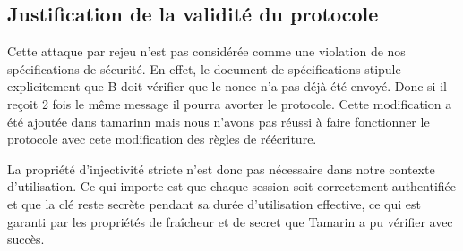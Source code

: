\subsection{Justification de la validité du protocole}

Cette attaque par rejeu n'est pas considérée comme une violation de nos spécifications de
sécurité. En effet, le document de spécifications stipule explicitement que B doit vérifier
que le nonce n'a pas déjà été envoyé. Donc si il reçoit 2 fois le même message il pourra avorter
le protocole. Cette modification a été ajoutée dans tamarinn mais nous n'avons pas réussi à faire
fonctionner le protocole avec cete modification des règles de réécriture.

La propriété d'injectivité stricte n'est donc pas nécessaire dans notre contexte d'utilisation.
Ce qui importe est que chaque session soit correctement authentifiée et que la clé reste secrète
pendant sa durée d'utilisation effective, ce qui est garanti par les propriétés de fraîcheur et
de secret que Tamarin a pu vérifier avec succès.